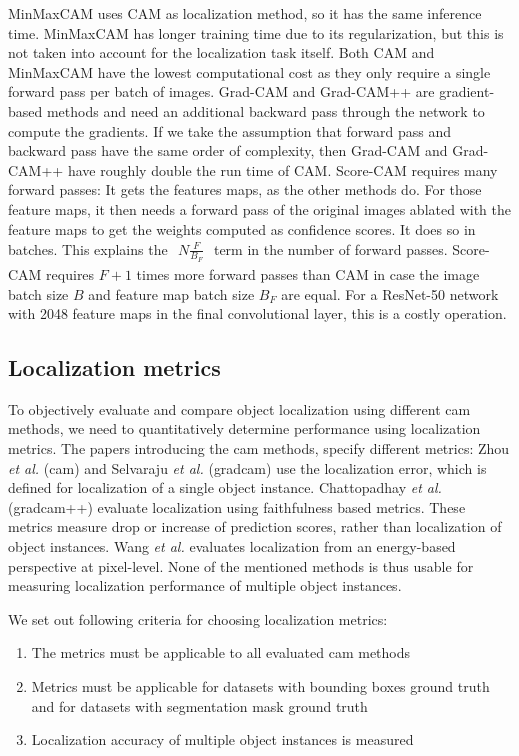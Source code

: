 MinMaxCAM uses CAM as localization method, so it has the same inference time. MinMaxCAM has longer training time due to its regularization, but this is not taken into account for the localization task itself. Both CAM and MinMaxCAM have the lowest computational cost as they only require a single forward pass per batch of images. Grad-CAM and Grad-CAM++ are gradient-based methods and need an additional backward pass through the network to compute the gradients. If we take the assumption that forward pass and backward pass have the same order of complexity, then Grad-CAM and Grad-CAM++ have roughly double the run time of CAM. Score-CAM requires many forward passes: It gets the features maps, as the other methods do. For those feature maps, it then needs a forward pass of the original images ablated with the feature maps to get the weights computed as confidence scores. It does so in batches. This explains the $\begin{aligned}N\frac{F}{B_F}\end{aligned}$ term in the number of forward passes. Score-CAM requires $F + 1$ times more forward passes than CAM in case the image batch size $B$ and feature map batch size $B_F$ are equal. For a ResNet-50 network with 2048 feature maps in the final convolutional layer, this is a costly operation.

\subsection{Localization metrics} \label{sec:localization_metrics}
To objectively evaluate and compare object localization using different \acrshort{cam} methods, we need to quantitatively determine performance using localization metrics. The papers introducing the \acrshort{cam} methods, specify different metrics: Zhou \textit{et al.} \cite{zhou2016cvpr} (\acrshort{cam}) and Selvaraju \textit{et al.} \cite{selvaraju2017grad} (\acrshort{gradcam}) use the localization error, which is defined for localization of a single object instance. Chattopadhay \textit{et al.} \cite{chattopadhay2018grad} (\acrshort{gradcam}++) evaluate localization using faithfulness based metrics. These metrics measure drop or increase of prediction scores, rather than localization of object instances. Wang \textit{et al.} \cite{wang2020score} evaluates localization from an energy-based perspective at pixel-level. None of the mentioned methods is thus usable for measuring localization performance of multiple object instances.

We set out following criteria for choosing localization metrics:
\begin{enumerate}
    \item The metrics must be applicable to all evaluated \acrshort{cam} methods
    \item Metrics must be applicable for datasets with bounding boxes ground truth and for datasets with segmentation mask ground truth
    \item Localization accuracy of multiple object instances is measured
\end{enumerate}

